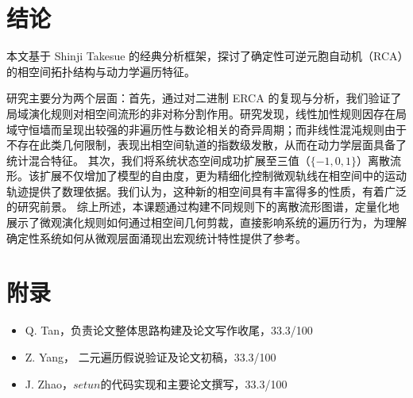 \documentclass[reprint, amsmath, amssymb, aps, physrev,prb]{revtex4-2}
\begin{document}
\section{结论}

本文基于 Shinji Takesue 的经典分析框架，探讨了确定性可逆元胞自动机（RCA）的相空间拓扑结构与动力学遍历特征。

研究主要分为两个层面：首先，通过对二进制 ERCA 的复现与分析，我们验证了局域演化规则对相空间流形的非对称分割作用。研究发现，线性加性规则因存在局域守恒墙而呈现出较强的非遍历性与数论相关的奇异周期；而非线性混沌规则由于不存在此类几何限制，表现出相空间轨道的指数级发散，从而在动力学层面具备了统计混合特征。
其次，我们将系统状态空间成功扩展至三值（$\{-1, 0, 1\}$）离散流形。该扩展不仅增加了模型的自由度，更为精细化控制微观轨线在相空间中的运动轨迹提供了数理依据。我们认为，这种新的相空间具有丰富得多的性质，有着广泛的研究前景。
综上所述，本课题通过构建不同规则下的离散流形图谱，定量化地展示了微观演化规则如何通过相空间几何剪裁，直接影响系统的遍历行为，为理解确定性系统如何从微观层面涌现出宏观统计特性提供了参考。



\appendix

\section{附录}
\begin{itemize}
    \item Q. Tan，负责论文整体思路构建及论文写作收尾，33.3/100
    \item Z. Yang， 二元遍历假说验证及论文初稿，33.3/100
    \item J. Zhao，$setun$的代码实现和主要论文撰写，33.3/100
\end{itemize}
\end{document}
